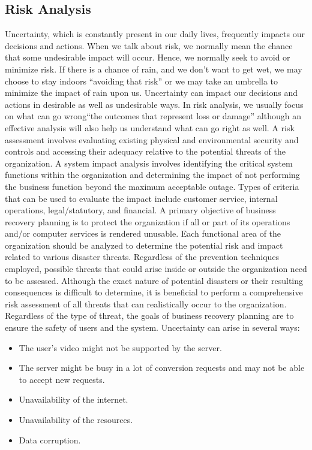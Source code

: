 		\subsection{Risk Analysis}
		\vs
		\hspace{1cm}Uncertainty, which is constantly present in our daily lives, frequently impacts our decisions and actions. When we talk about risk, we normally mean the chance that some undesirable impact will occur. Hence, we normally seek to avoid or minimize risk. If there is a chance of rain, and we don't want to get wet, we may choose to stay indoors “avoiding that risk” or we may take an umbrella to minimize the impact of rain upon us. Uncertainty can impact our decisions and actions in desirable as well as undesirable ways. In risk analysis, we usually focus on what can go wrong“the outcomes that represent loss or damage” although an effective analysis will also help us understand what can go right as well. 
		\vs
		A risk assessment involves evaluating existing physical and environmental security and controls and accessing their adequacy relative to the potential threats of the organization. A system impact analysis involves identifying the critical system functions within the organization and determining the impact of not performing the business function beyond the maximum acceptable outage. Types of criteria that can be used to evaluate the impact include customer service, internal operations, legal/statutory, and financial.
		\vs
		A primary objective of business recovery planning is to protect the organization if all or part of its operations and/or computer services is rendered unusable. Each functional area of the organization should be analyzed to determine the potential risk and impact related to various disaster threats.
		\vs
		Regardless of the prevention techniques employed, possible threats that could arise inside or outside the organization need to be assessed. Although the exact nature of potential disasters or their resulting consequences is difficult to determine, it is beneficial to perform a comprehensive risk assessment of all threats that can realistically occur to the organization. Regardless of the type of threat, the goals of business recovery planning are to ensure the safety of users and the system. 
		\vs
		Uncertainty can arise in several ways:
		\begin{itemize}
			\item The user's video might not be supported by the server.
			\item The server might be busy in a lot of conversion requests and may not be able to accept new requests.
			\item Unavailability of the internet.
			\item Unavailability of the resources.
			\item Data corruption.
		\end{itemize}